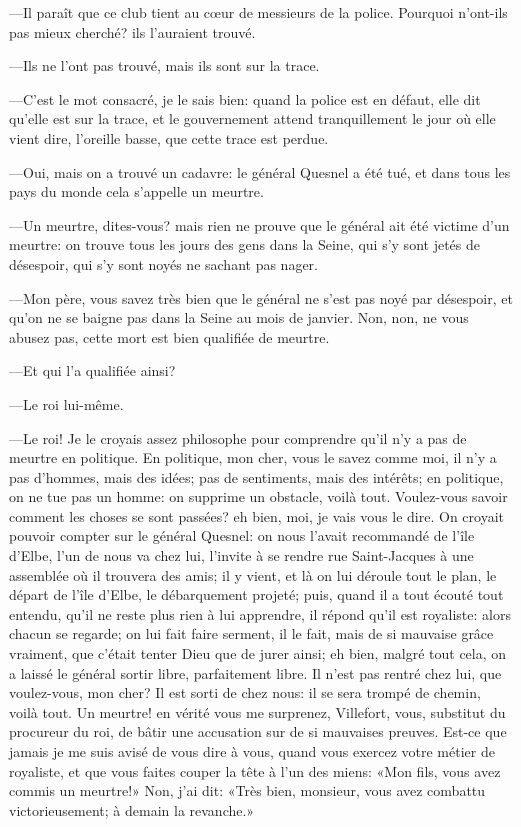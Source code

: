 —Il paraît que ce club tient au cœur de messieurs de la police. Pourquoi n'ont-ils pas mieux cherché? ils l'auraient trouvé.

—Ils ne l'ont pas trouvé, mais ils sont sur la trace.

—C'est le mot consacré, je le sais bien: quand la police est en défaut, elle dit qu'elle est sur la trace, et le gouvernement attend tranquillement le jour où elle vient dire, l'oreille basse, que cette trace est perdue.

—Oui, mais on a trouvé un cadavre: le général Quesnel a été tué, et dans tous les pays du monde cela s'appelle un meurtre.

—Un meurtre, dites-vous? mais rien ne prouve que le général ait été victime d'un meurtre: on trouve tous les jours des gens dans la Seine, qui s'y sont jetés de désespoir, qui s'y sont noyés ne sachant pas nager.

—Mon père, vous savez très bien que le général ne s'est pas noyé par désespoir, et qu'on ne se baigne pas dans la Seine au mois de janvier. Non, non, ne vous abusez pas, cette mort est bien qualifiée de meurtre.

—Et qui l'a qualifiée ainsi?

—Le roi lui-même.

—Le roi! Je le croyais assez philosophe pour comprendre qu'il n'y a pas de meurtre en politique. En politique, mon cher, vous le savez comme moi, il n'y a pas d'hommes, mais des idées; pas de sentiments, mais des intérêts; en politique, on ne tue pas un homme: on supprime un obstacle, voilà tout. Voulez-vous savoir comment les choses se sont passées? eh bien, moi, je vais vous le dire. On croyait pouvoir compter sur le général Quesnel: on nous l'avait recommandé de l'île d'Elbe, l'un de nous va chez lui, l'invite à se rendre rue Saint-Jacques à une assemblée où il trouvera des amis; il y vient, et là on lui déroule tout le plan, le départ de l'île d'Elbe, le débarquement projeté; puis, quand il a tout écouté tout entendu, qu'il ne reste plus rien à lui apprendre, il répond qu'il est royaliste: alors chacun se regarde; on lui fait faire serment, il le fait, mais de si mauvaise grâce vraiment, que c'était tenter Dieu que de jurer ainsi; eh bien, malgré tout cela, on a laissé le général sortir libre, parfaitement libre. Il n'est pas rentré chez lui, que voulez-vous, mon cher? Il est sorti de chez nous: il se sera trompé de chemin, voilà tout. Un meurtre! en vérité vous me surprenez, Villefort, vous, substitut du procureur du roi, de bâtir une accusation sur de si mauvaises preuves. Est-ce que jamais je me suis avisé de vous dire à vous, quand vous exercez votre métier de royaliste, et que vous faites couper la tête à l'un des miens: «Mon fils, vous avez commis un meurtre!» Non, j'ai dit: «Très bien, monsieur, vous avez combattu victorieusement; à demain la revanche.»

